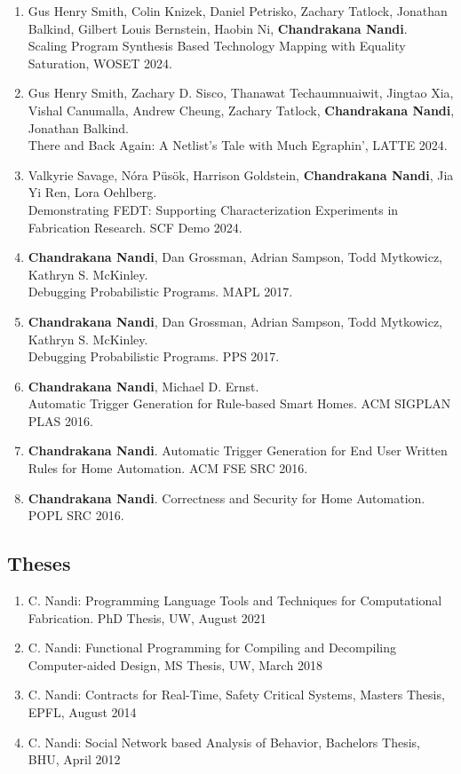 \documentclass[margin, 10pt]{res} %
\begin{document}
\begin{resume}
\begin{enumerate}
  \item Gus Henry Smith, Colin Knizek, Daniel Petrisko, Zachary Tatlock, Jonathan Balkind, Gilbert Louis Bernstein, Haobin Ni, \textbf{Chandrakana Nandi}. \\ Scaling Program Synthesis Based Technology Mapping with Equality Saturation, WOSET 2024.
  \item Gus Henry Smith, Zachary D. Sisco, Thanawat Techaumnuaiwit, Jingtao Xia, Vishal Canumalla, Andrew Cheung, Zachary Tatlock, \textbf{Chandrakana Nandi}, Jonathan Balkind. \\  There and Back Again: A Netlist's Tale with Much Egraphin', LATTE 2024.
  \item Valkyrie Savage, Nóra Püsök, Harrison Goldstein, \textbf{Chandrakana Nandi}, Jia Yi Ren, Lora Oehlberg. \\
    Demonstrating FEDT: Supporting Characterization Experiments in Fabrication Research. SCF Demo 2024.
\item \textbf{Chandrakana Nandi}, Dan Grossman, Adrian Sampson, Todd Mytkowicz, Kathryn S. McKinley. \\ Debugging Probabilistic Programs. MAPL 2017.
\item \textbf{Chandrakana Nandi}, Dan Grossman, Adrian Sampson, Todd Mytkowicz, Kathryn S. McKinley. \\ Debugging Probabilistic Programs. PPS 2017.
\item \textbf{Chandrakana Nandi}, Michael D. Ernst. \\ Automatic Trigger Generation for Rule-based Smart Homes. ACM SIGPLAN PLAS 2016.
\item \textbf{Chandrakana Nandi}. Automatic Trigger Generation for End User Written Rules for Home Automation. ACM FSE SRC 2016.
\item \textbf{Chandrakana Nandi}. Correctness and Security for Home Automation. POPL SRC 2016.
\end{enumerate}

\subsection{Theses}
\begin{enumerate}
\item C. Nandi: Programming Language Tools and Techniques for Computational Fabrication. {PhD Thesis}, UW, August 2021
\item C. Nandi: Functional Programming for Compiling and Decompiling Computer-aided Design, {MS Thesis}, UW, March 2018
\item C. Nandi: Contracts for Real-Time, Safety Critical Systems, {Masters Thesis}, EPFL, August 2014
\item C. Nandi: Social Network based Analysis of Behavior, {Bachelors Thesis}, BHU, April 2012
\end{enumerate}


\end{resume}
\end{document}
